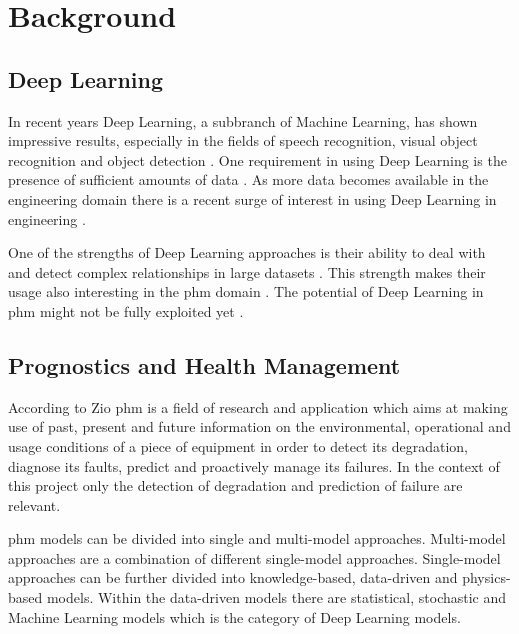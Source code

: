 \documentclass[conference]{IEEEtran}
\begin{document}
\IEEEpeerreviewmaketitle

\section{Background}
\label{sec:background}

\subsection{Deep Learning}

In recent years Deep Learning, a subbranch of Machine Learning, has shown impressive results, especially in the fields of speech recognition, visual object recognition and object detection \cite{LeCun2015}. One requirement in using Deep Learning is the presence of sufficient amounts of data \cite{Sikorska2011}. As more data becomes available in the engineering domain there is a recent surge of interest in using Deep Learning in engineering \cite{Voulodimos2018}.

One of the strengths of Deep Learning approaches is their ability to deal with and detect complex relationships in large datasets \cite{MONTEROJIMENEZ2020539}. This strength makes their usage also interesting in the \gls{phm} domain \cite{Wu2015}. The potential of Deep Learning in \gls{phm} might not be fully exploited yet \cite{Akrim2021}.

\subsection{Prognostics and Health Management}

According to Zio \cite{Zio2012} \gls{phm} is a field of research and application which aims at making use of past, present and future information on the environmental, operational and usage conditions of a piece of equipment in order to detect its degradation, diagnose its faults, predict and proactively manage its failures. In the context of this project only the detection of degradation and prediction of failure are relevant.

\gls{phm} models can be divided into single and multi-model approaches. Multi-model approaches are a combination of different single-model approaches. Single-model approaches can be further divided into knowledge-based, data-driven and physics-based models. Within the data-driven models there are statistical, stochastic and Machine Learning models which is the category of Deep Learning models. \cite{MONTEROJIMENEZ2020539}
\end{document}
